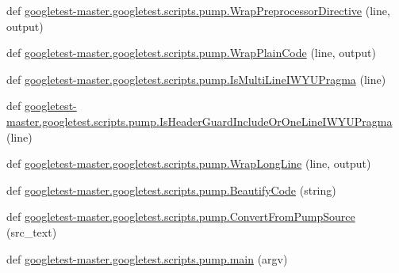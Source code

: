 \begin{DoxyCompactItemize}
def \mbox{\hyperlink{namespacegoogletest-master_1_1googletest_1_1scripts_1_1pump_a0b2798bac4eb00d18ba9984569a19793}{googletest-\/master.\+googletest.\+scripts.\+pump.\+Wrap\+Preprocessor\+Directive}} (line, output)
\item 
def \mbox{\hyperlink{namespacegoogletest-master_1_1googletest_1_1scripts_1_1pump_a442d8c63e9bfec53e0802ae7ee4c2516}{googletest-\/master.\+googletest.\+scripts.\+pump.\+Wrap\+Plain\+Code}} (line, output)
\item 
def \mbox{\hyperlink{namespacegoogletest-master_1_1googletest_1_1scripts_1_1pump_aafe6ed37e1501cfcc2a4c6189d77b382}{googletest-\/master.\+googletest.\+scripts.\+pump.\+Is\+Multi\+Line\+I\+W\+Y\+U\+Pragma}} (line)
\item 
def \mbox{\hyperlink{namespacegoogletest-master_1_1googletest_1_1scripts_1_1pump_afd21629e499fb8ba3108318ff7bb6555}{googletest-\/master.\+googletest.\+scripts.\+pump.\+Is\+Header\+Guard\+Include\+Or\+One\+Line\+I\+W\+Y\+U\+Pragma}} (line)
\item 
def \mbox{\hyperlink{namespacegoogletest-master_1_1googletest_1_1scripts_1_1pump_abc972428be28e7de22c3e8b860e1058b}{googletest-\/master.\+googletest.\+scripts.\+pump.\+Wrap\+Long\+Line}} (line, output)
\item 
def \mbox{\hyperlink{namespacegoogletest-master_1_1googletest_1_1scripts_1_1pump_ace5c606a1b5b7e11c1ea00921021b461}{googletest-\/master.\+googletest.\+scripts.\+pump.\+Beautify\+Code}} (string)
\item 
def \mbox{\hyperlink{namespacegoogletest-master_1_1googletest_1_1scripts_1_1pump_aa5b7fd91e17856b15706074ec13699a0}{googletest-\/master.\+googletest.\+scripts.\+pump.\+Convert\+From\+Pump\+Source}} (src\+\_\+text)
\item 
def \mbox{\hyperlink{namespacegoogletest-master_1_1googletest_1_1scripts_1_1pump_a30ea327c8d3781c9a2b2857a83573094}{googletest-\/master.\+googletest.\+scripts.\+pump.\+main}} (argv)
\end{DoxyCompactItemize}
